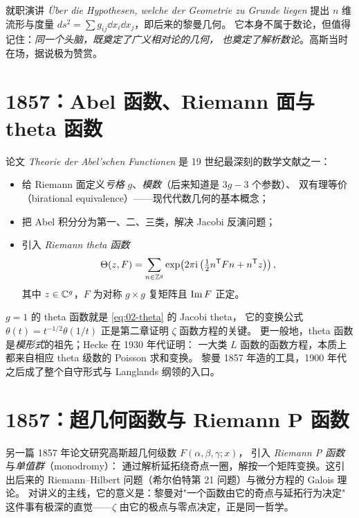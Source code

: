 就职演讲 \emph{\"Uber die Hypothesen, welche der Geometrie zu Grunde liegen}
提出 $n$ 维流形与度量 $ds^2=\sum g_{ij}\dd x_i\dd x_j$，即后来的黎曼几何。
它本身不属于数论，但值得记住：\emph{同一个头脑，既奠定了广义相对论的几何，
也奠定了解析数论}。高斯当时在场，据说极为赞赏。

\section{1857：Abel 函数、Riemann 面与 theta 函数}
\label{sec:05-theta}

论文 \emph{Theorie der Abel'schen Functionen} 是 19 世纪最深刻的数学文献之一：

\begin{itemize}
  \item 给 Riemann 面定义\emph{亏格} $g$、\emph{模数}（后来知道是 $3g-3$ 个参数）、
        双有理等价（birational equivalence）——现代代数几何的基本概念；
  \item 把 Abel 积分分为第一、二、三类，解决 Jacobi 反演问题；
  \item 引入 \emph{Riemann theta 函数}
        \begin{equation}\label{eq:05-theta}
          \Theta(z,F)=\sum_{n\in\mathbb{Z}^{g}}
          \exp\!\left(2\pi\mathrm{i}\left(\tfrac12 n^{\mathsf T}F n+n^{\mathsf T}z\right)\right),
        \end{equation}
        其中 $z\in\mathbb{C}^g$，$F$ 为对称 $g\times g$ 复矩阵且 $\operatorname{Im} F$ 正定。
\end{itemize}

\begin{histbox}
$g=1$ 的 theta 函数就是 \cref{eq:02-theta} 的 Jacobi theta，
它的变换公式 $\theta(t)=t^{-1/2}\theta(1/t)$ 正是第二章证明 $\zeta$ 函数方程的关键。
更一般地，theta 函数是\emph{模形式}的祖先；Hecke 在 1930 年代证明：
一大类 $L$ 函数的函数方程，本质上都来自相应 theta 级数的 Poisson 求和变换。
黎曼 1857 年造的工具，1900 年代之后成了整个自守形式与 Langlands 纲领的入口。
\end{histbox}

\section{1857：超几何函数与 Riemann P 函数}
\label{sec:05-P}

另一篇 1857 年论文研究高斯超几何级数 $F(\alpha,\beta,\gamma;x)$，
引入 \emph{Riemann P 函数}与\emph{单值群}（monodromy）：
通过解析延拓绕奇点一圈，解按一个矩阵变换。这引出后来的
Riemann--Hilbert 问题（希尔伯特第 21 问题）与微分方程的 Galois 理论。
对讲义的主线，它的意义是：黎曼对"一个函数由它的奇点与延拓行为决定"
这件事有极深的直觉——$\zeta$ 由它的极点与零点决定，正是同一哲学。

